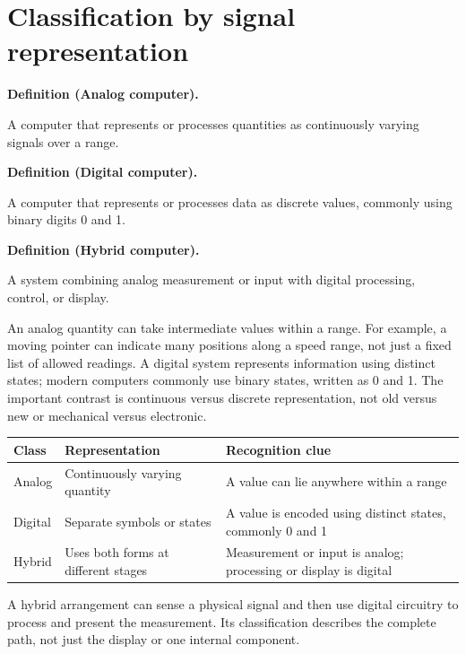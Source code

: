 \documentclass[11pt]{article}
\newenvironment{definitionbox}[1]{%
  \par\noindent\textbf{Definition (#1).}\ \itshape
}{\par\vspace{0.3em}}
\begin{document}
\section{Classification by signal representation}
\begin{definitionbox}{Analog computer}
A computer that represents or processes quantities as continuously varying
signals over a range.
\end{definitionbox}

\begin{definitionbox}{Digital computer}
A computer that represents or processes data as discrete values, commonly
using binary digits 0 and 1.
\end{definitionbox}

\begin{definitionbox}{Hybrid computer}
A system combining analog measurement or input with digital processing,
control, or display.
\end{definitionbox}

An analog quantity can take intermediate values within a range. For
example, a moving pointer can indicate many positions along a speed range,
not just a fixed list of allowed readings. A digital system represents
information using distinct states; modern computers commonly use binary
states, written as 0 and 1. The important contrast is continuous versus
discrete representation, not old versus new or mechanical versus electronic.

\begin{center}
\begin{tabular}{p{}p{}p{}}
\toprule
\textbf{Class} & \textbf{Representation} & \textbf{Recognition clue}\\
\midrule
Analog & Continuously varying quantity & A value can lie anywhere within a range\\
Digital & Separate symbols or states & A value is encoded using distinct states, commonly 0 and 1\\
Hybrid & Uses both forms at different stages & Measurement or input is analog; processing or display is digital\\
\bottomrule
\end{tabular}
\end{center}

A hybrid arrangement can sense a physical signal and then use digital
circuitry to process and present the measurement. Its classification
describes the complete path, not just the display or one internal component.
\end{document}
